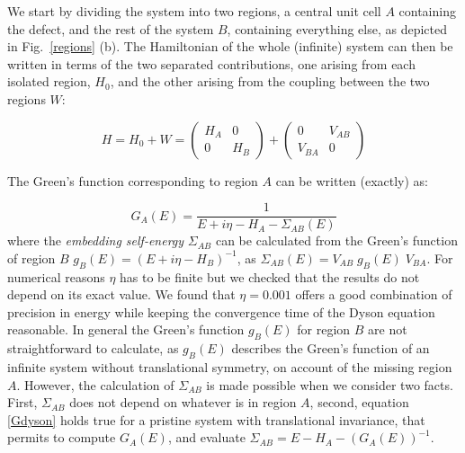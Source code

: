We start by dividing the system into two regions, a central unit cell $A$ containing the defect, and the rest of the system $B$, containing everything else, as depicted in Fig.~\ref{regions} (b).
The Hamiltonian of the whole (infinite) system can then be written in terms of the two separated contributions, one arising from each isolated region, $H_0$, and the other arising from the coupling between the two regions $W$:

\begin{equation}
  H = H_{0} + W = \left(\begin{array}{cc}
   H_{A} &  0  \\
    0     & H_{B}
  \end{array}\right)+
  \left(\begin{array}{cc}
    0 & V_{AB} \\
   V_{BA} & 0
  \end{array}\right)
\end{equation}

The Green's function corresponding to region $A$ can be written (exactly) as:

\begin{equation}
  G_{A}(E) %
  = \frac{1}{E +i\eta - H_{A}-\Sigma_{AB}(E)}
  \label{Gdyson}
\end{equation}
where the \emph{embedding self-energy} $\Sigma_{AB}$ can be calculated from the Green's function of region $B$ %
$g_B(E)=(E+i\eta-H_B)^{-1}$, as $\Sigma_{AB}(E)=V_{AB}\;g_B(E)\;V_{BA}$.
For numerical reasons $\eta$ has to be finite but we checked that the results do not depend on its exact value. We found that $\eta=0.001$ offers a good combination of precision in energy while keeping the convergence time of the Dyson equation reasonable.
In general the Green's function $g_B(E)$ for region $B$
are not straightforward to calculate, as $g_B(E)$ describes the Green's function of an infinite system without translational symmetry, on account of the missing region $A$.
However, the calculation of $\Sigma_{AB}$ is made possible when we consider two facts. First, $\Sigma_{AB}$ does not depend on whatever is in region $A$, second, equation \eqref{Gdyson} holds true for a pristine system with translational invariance, that permits to compute $G_A(E)$, and evaluate $\Sigma_{AB}=E- H_A-(G_A(E))^{-1}$.



